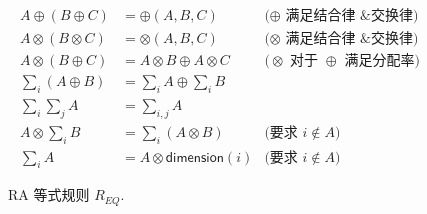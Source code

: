 \begin{figure}
\centering
\begin{align}
  \label{eq:RRC_pp} A \oplus (B \oplus C) &= \oplus (A, B, C)
  & \text{($\oplus$ 满足结合律 \& 交换律)}
  \\
  \label{eq:RRC_mm} A \otimes (B \otimes C) &= \otimes (A, B, C)
  & \text{($\otimes$ 满足结合律 \& 交换律)}
  \\
  \label{eq:RRC_mp} A \otimes (B \oplus C) &= A \otimes B \oplus A \otimes C
  & \text{($\otimes$ 对于 $\oplus$ 满足分配率)}
  \\
  \label{eq:RRC_ap} \sum_i (A \oplus B) &= \sum_i A \oplus \sum_i B
  \\
  \label{eq:RRC_aa} \sum_i \sum_j A &= \sum_{i,j} A
  \\
  \label{eq:RRC_ma} A \otimes \sum_i B &= \sum_i (A \otimes B)
  &\text{(要求 $i \not\in A$)}
  \\
  \label{eq:RRC_ac} \sum_i A &= A \otimes \textsf{dimension}(i)
  &\text{(要求 $i \not\in A$)}
\end{align}
\caption{RA 等式规则 $R_{EQ}$.}
\label{fig:RRC}
\end{figure}


